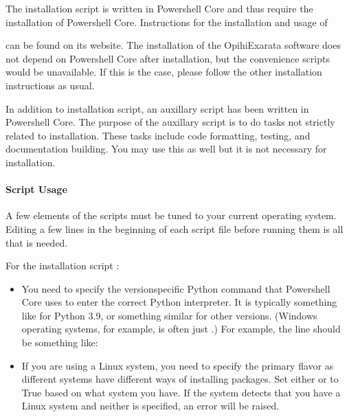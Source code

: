 \documentclass[letterpaper,11pt,english]{sphinxmanual}
\begin{document}
\sphinxAtStartPar
The installation script is written in Powershell Core and thus require the
installation of Powershell Core. Instructions for the installation and usage
of %
\begin{footnote}[26]\sphinxAtStartFootnote
{}
%
\end{footnote} can be
found on its website. The installation of the OpihiExarata software does not
depend on Powershell Core after installation, but the convenience scripts
would be unavailable. If this is the case, please follow the other
installation instructions as usual.

\sphinxAtStartPar
In addition to installation script, an auxillary script has been written in
Powershell Core. The purpose of the auxillary script is to do tasks not
strictly related to installation. These tasks include code formatting,
testing, and documentation building. You may use this as well but it is not
necessary for installation.


\paragraph{Script Usage}
\label{\detokenize{technical/installation/index:script-usage}}
\sphinxAtStartPar
A few elements of the scripts must be tuned to your current operating system.
Editing a few lines in the beginning of each script file before running them
is all that is needed.

\sphinxAtStartPar
For the installation script :
\begin{itemize}
\item {} 
\sphinxAtStartPar
You need to specify the version\sphinxhyphen{}specific Python command that Powershell Core uses to enter the correct Python interpreter. It is typically something like  for Python 3.9, or something similar for other versions. (Windows operating systems, for example, is often just .) For example, the line should be something like:

\begin{sphinxVerbatim}[commandchars=\\\{\}]
    
\end{sphinxVerbatim}

\item {} 
\sphinxAtStartPar
If you are using a Linux system, you need to specify the primary flavor as different systems have different ways of installing packages. Set either  or  to True based on what system you have. If the system detects that you have a Linux system and neither is specified, an error will be raised.

\end{itemize}
\end{document}
